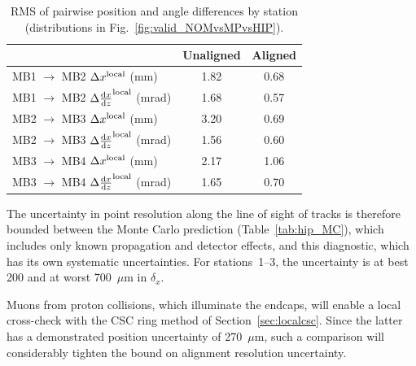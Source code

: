\begin{table}[p]
\caption{RMS of pairwise position and angle differences by station (distributions in Fig.~\ref{fig:valid_NOMvsMPvsHIP}). \label{tab:valid_NOMvsMPvsHIP}}
\centering

\vspace{0.25 cm}
\renewcommand{\arraystretch}{1.5}
\begin{tabular}{l | c c}
\hline\hline & \hspace{0.5 cm} Unaligned \hspace{0.5 cm} & \hspace{0.5 cm} Aligned \hspace{0.5 cm} \\\hline
MB1 $\to$ MB2 \hspace{0.25 cm} $\Delta x^{\mbox{\scriptsize local}}$ (mm) & 1.82 & 0.68 \\
MB1 $\to$ MB2 \hspace{0.25 cm} $\Delta \frac{\textrm{d}x}{\textrm{d}z}^{\mbox{\scriptsize local}}$ (mrad) & 1.68 & 0.57 \\\hline
MB2 $\to$ MB3 \hspace{0.25 cm} $\Delta x^{\mbox{\scriptsize local}}$ (mm) & 3.20 & 0.69 \\
MB2 $\to$ MB3 \hspace{0.25 cm} $\Delta \frac{\textrm{d}x}{\textrm{d}z}^{\mbox{\scriptsize local}}$ (mrad) & 1.56 & 0.60 \\\hline
MB3 $\to$ MB4 \hspace{0.25 cm} $\Delta x^{\mbox{\scriptsize local}}$ (mm) & 2.17 & 1.06 \\
MB3 $\to$ MB4 \hspace{0.25 cm} $\Delta \frac{\textrm{d}x}{\textrm{d}z}^{\mbox{\scriptsize local}}$ (mrad) & 1.65 & 0.70 \\\hline\hline
\end{tabular}
\end{table}

The uncertainty in point resolution along the line of sight of tracks
is therefore bounded between the Monte Carlo prediction
(Table~\ref{tab:hip_MC}), which includes only known propagation and
detector effects, and this diagnostic, which has its own systematic
uncertainties.  For stations~1--3, the uncertainty is at best 200 and
at worst 700~$\mu$m in $\delta_x$.

Muons from proton collisions, which illuminate the endcaps,
will enable a local cross-check with the CSC ring method of
Section~\ref{sec:localcsc}.  Since the latter has a demonstrated
position uncertainty of 270~$\mu$m, such a comparison will
considerably tighten the bound on alignment resolution uncertainty.

